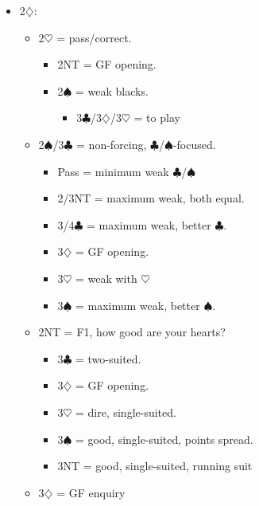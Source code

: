 \documentclass[a4paper,14pt]{extarticle}
\begin{document}
\begin{itemize}
\begin{itemize}
	\end{itemize}

\newpage

\item 2$\diamondsuit$:
	\begin{itemize}
   \item 2$\heartsuit$ = pass/correct.
		\begin{itemize}
      \item 2NT = GF opening.
      \item 2$\spadesuit$ = weak blacks.
			\begin{itemize}
			\item 3$\clubsuit$/3$\diamondsuit$/3$\heartsuit$ = to play
			\end{itemize}
		\end{itemize}
   \item 2$\spadesuit$/3$\clubsuit$ = non-forcing, $\clubsuit$/$\spadesuit$-focused.
		\begin{itemize}
		\item Pass = minimum weak $\clubsuit$/$\spadesuit$
      \item 2/3NT = maximum weak, both equal.
      \item 3/4$\clubsuit$ = maximum weak, better $\clubsuit$.
      \item 3$\diamondsuit$ = GF opening.
      \item 3$\heartsuit$ = weak with $\heartsuit$
      \item 3$\spadesuit$ = maximum weak, better $\spadesuit$.
		\end{itemize}
   \item 2NT = F1, how good are your hearts?
		\begin{itemize}
      \item 3$\clubsuit$ = two-suited.
      \item 3$\diamondsuit$ = GF opening.
      \item 3$\heartsuit$ = dire, single-suited.
      \item 3$\spadesuit$ = good, single-suited, points spread.
      \item 3NT = good, single-suited, running suit
		\end{itemize}
	\item 3$\diamondsuit$ = GF enquiry
	\end{itemize}

\newpage


\end{itemize}
\end{document}
